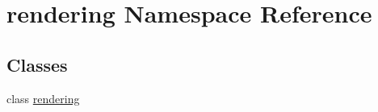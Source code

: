 \hypertarget{namespacerendering}{}\section{rendering Namespace Reference}
\label{namespacerendering}
\subsection*{Classes}
\begin{DoxyCompactItemize}
\item 
class \hyperlink{classrendering_1_1rendering}{rendering}
\end{DoxyCompactItemize}
